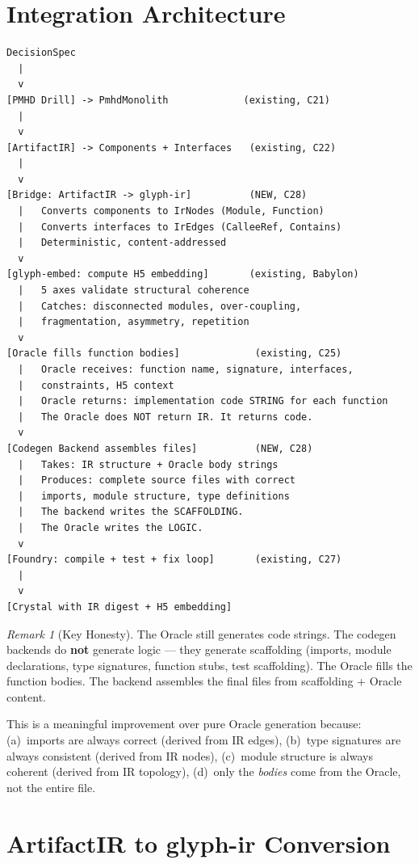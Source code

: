 \documentclass[11pt,a4paper,twoside]{article}
\theoremstyle{definition}
\theoremstyle{plain}
\theoremstyle{remark}
\newtheorem{remark}{Remark}[section]
\begin{document}
\section{Integration Architecture}\label{sec:arch}

\begin{lstlisting}[title={The Honest Pipeline}]
DecisionSpec
  |
  v
[PMHD Drill] -> PmhdMonolith             (existing, C21)
  |
  v
[ArtifactIR] -> Components + Interfaces   (existing, C22)
  |
  v
[Bridge: ArtifactIR -> glyph-ir]          (NEW, C28)
  |   Converts components to IrNodes (Module, Function)
  |   Converts interfaces to IrEdges (CalleeRef, Contains)
  |   Deterministic, content-addressed
  v
[glyph-embed: compute H5 embedding]       (existing, Babylon)
  |   5 axes validate structural coherence
  |   Catches: disconnected modules, over-coupling,
  |   fragmentation, asymmetry, repetition
  v
[Oracle fills function bodies]             (existing, C25)
  |   Oracle receives: function name, signature, interfaces,
  |   constraints, H5 context
  |   Oracle returns: implementation code STRING for each function
  |   The Oracle does NOT return IR. It returns code.
  v
[Codegen Backend assembles files]          (NEW, C28)
  |   Takes: IR structure + Oracle body strings
  |   Produces: complete source files with correct
  |   imports, module structure, type definitions
  |   The backend writes the SCAFFOLDING.
  |   The Oracle writes the LOGIC.
  v
[Foundry: compile + test + fix loop]       (existing, C27)
  |
  v
[Crystal with IR digest + H5 embedding]
\end{lstlisting}

\begin{remark}[Key Honesty]
The Oracle still generates code strings. The codegen backends do
\textbf{not} generate logic --- they generate scaffolding (imports,
module declarations, type signatures, function stubs, test
scaffolding). The Oracle fills the function bodies. The backend
assembles the final files from scaffolding + Oracle content.

This is a meaningful improvement over pure Oracle generation because:
(a)~imports are always correct (derived from IR edges),
(b)~type signatures are always consistent (derived from IR nodes),
(c)~module structure is always coherent (derived from IR topology),
(d)~only the \emph{bodies} come from the Oracle, not the entire file.
\end{remark}


\section{ArtifactIR to glyph-ir Conversion}\label{sec:convert}
\end{document}
